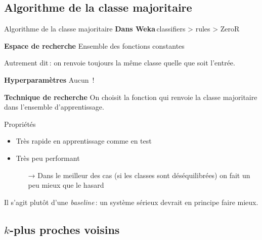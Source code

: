 \documentclass[hyperref={unicode}, xcolor={svgnames}, french]{beamer}
\begin{document}

\subsection{Algorithme de la classe majoritaire}
\begin{frame}{Algorithme de la classe majoritaire}
    \textbf{Dans Weka} classifiers > rules > ZeroR

    \textbf{Espace de recherche} Ensemble des fonctions constantes

    Autrement dit : on renvoie toujours la même classe quelle que soit l'entrée.

    \textbf{Hyperparamètres} Aucun !

    \textbf{Technique de recherche} On choisit la fonction qui renvoie la classe majoritaire dans l'ensemble d'apprentissage.
\end{frame}

\begin{frame}{Propriétés}
    \begin{itemize}
        \item Très rapide en apprentissage comme en test
        \item Très peu performant
            \begin{itemize}
                \item[→] Dans le meilleur des cas (si les classes sont déséquilibrées) on fait un peu mieux que le hasard
            \end{itemize}
    \end{itemize}
    Il s'agit plutôt d'une \emph{baseline} : un système sérieux devrait en principe faire mieux.
\end{frame}


\subsection{$k$-plus proches voisins}
\end{document}
